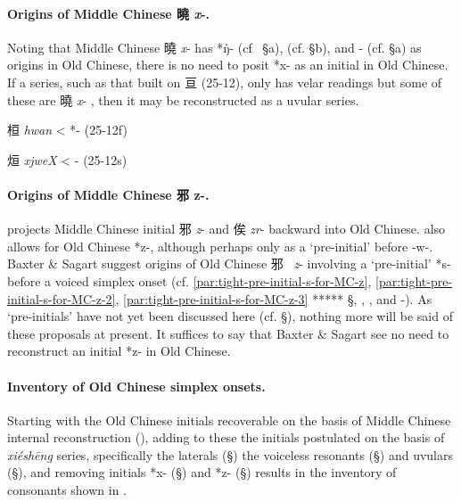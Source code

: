 \paragraph{Origins of Middle Chinese 曉
 \emph{x}-.} Noting that Middle Chinese 曉  \emph{x}-
has *ŋ̊- (cf~ §a), {} (cf. §b), and {}- (cf. §a) as origins in Old
Chinese, there is no need to posit *x- as an initial in Old Chinese. If
a series, such as that built on 亘 (25-12), only has velar readings but
some of these are 曉  \emph{x}- , then it may be reconstructed as a
uvular series.

\begin{description} \item
桓  \emph{hwan} \textless{} *{}- (25-12f)
\item
烜  \emph{xjweX} \textless{} {}- (25-12s)
\end{description}

\paragraph{Origins of Middle Chinese 邪 z-.}
\citet[206]{Baxter1992}
projects Middle Chinese initial 邪 \emph{z}- and 俟
 \emph{zr}- backward into Old Chinese. 
 \citet[27]{Schuessler2009minimal}
 also allows
for Old Chinese *z-, although perhaps only as a `pre-initial' before
-w-. Baxter \& Sagart suggest origins of Old Chinese 邪~ \emph{z}-
involving a `pre-initial' *s- before a voiced simplex onset (cf. \ref{par:tight-pre-initial-s-for-MC-z},
\ref{par:tight-pre-initial-s-for-MC-z-2}, 
\ref{par:tight-pre-initial-s-for-MC-z-3}
*****
§, , ,
and -). As `pre-initials' have not yet been discussed here (cf. §),
nothing more will be said of these proposals at present. It suffices to
say that Baxter \& Sagart see no need to reconstruct an initial *z- in
Old Chinese.

\paragraph{Inventory of Old Chinese simplex
onsets.} Starting with the Old Chinese initials recoverable on the
basis of Middle Chinese internal reconstruction (), adding to these the
initials postulated on the basis of  \emph{xiéshēng} series, specifically
the laterals (§) the voiceless resonants (§) and uvulars (§), and
removing initials *x- (§) and *z- (§) results in the inventory of
consonants shown in .

